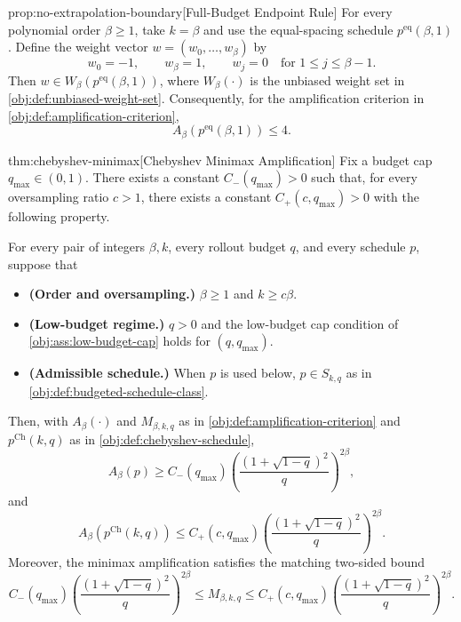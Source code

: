 \begin{propositionv}{prop:no-extrapolation-boundary}[Full-Budget Endpoint Rule]
For every polynomial order \(\beta\ge 1\), take \(k=\beta\) and use the equal-spacing schedule \(p^{\mathrm{eq}}(\beta,1)\). Define the weight vector \(w=(w_0,\ldots,w_\beta)\) by
\[
w_0=-1,\qquad w_\beta=1,\qquad w_j=0 \quad\text{for } 1\le j\le \beta-1 .
\]
Then \(w\in W_\beta(p^{\mathrm{eq}}(\beta,1))\), where \(W_\beta(\cdot)\) is the unbiased weight set in \cref{obj:def:unbiased-weight-set}. Consequently, for the amplification criterion in \cref{obj:def:amplification-criterion},
\[
A_\beta\!\left(p^{\mathrm{eq}}(\beta,1)\right)\le 4 .
\]
\end{propositionv}

\begin{theoremv}{thm:chebyshev-minimax}[Chebyshev Minimax Amplification]
Fix a budget cap \(q_{\max}\in(0,1)\). There exists a constant
\(C_-(q_{\max})>0\) such that, for every oversampling ratio \(c>1\), there
exists a constant \(C_+(c,q_{\max})>0\) with the following property.

For every pair of integers \(\beta,k\), every rollout budget \(q\), and every
schedule \(p\), suppose that
\begin{itemize}
\item \textbf{(Order and oversampling.)} \(\beta\ge 1\) and \(k\ge c\beta\).
\item \textbf{(Low-budget regime.)} \(q>0\) and the low-budget cap condition of
\cref{obj:ass:low-budget-cap} holds for \((q,q_{\max})\).
\item \textbf{(Admissible schedule.)} When \(p\) is used below, \(p\in S_{k,q}\)
as in \cref{obj:def:budgeted-schedule-class}.
\end{itemize}
Then, with \(A_\beta(\cdot)\) and \(M_{\beta,k,q}\) as in
\cref{obj:def:amplification-criterion} and
\(p^{\mathrm{Ch}}(k,q)\) as in \cref{obj:def:chebyshev-schedule},
\[
A_\beta(p)
\ge
C_-(q_{\max})
\left(\frac{(1+\sqrt{1-q})^2}{q}\right)^{2\beta},
\]
and
\[
A_\beta\!\left(p^{\mathrm{Ch}}(k,q)\right)
\le
C_+(c,q_{\max})
\left(\frac{(1+\sqrt{1-q})^2}{q}\right)^{2\beta}.
\]
Moreover, the minimax amplification satisfies the matching two-sided bound
\[
C_-(q_{\max})
\left(\frac{(1+\sqrt{1-q})^2}{q}\right)^{2\beta}
\le
M_{\beta,k,q}
\le
C_+(c,q_{\max})
\left(\frac{(1+\sqrt{1-q})^2}{q}\right)^{2\beta}.
\]
\end{theoremv}

